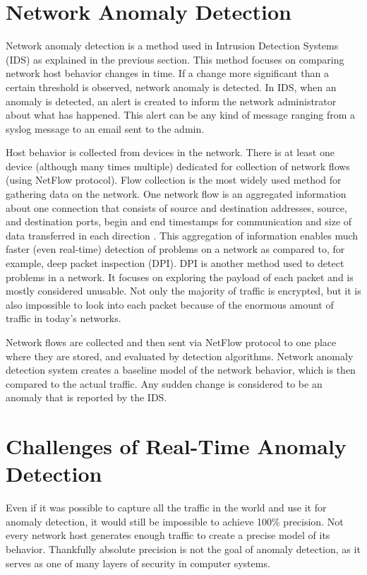 \documentclass[thesis=B,english]{FITthesis}[2012/10/20]
\begin{document}
\section{Network Anomaly Detection}\label{sec:nbad}
Network anomaly detection is a method used in Intrusion Detection Systems (IDS) as explained in the previous section.
This method focuses on comparing network host behavior changes in time.
If a change more significant than a certain threshold is observed, network anomaly is detected.
In IDS, when an anomaly is detected, an alert is created to inform the network administrator about what has happened.
This alert can be any kind of message ranging from a syslog message to an email sent to the admin.

Host behavior is collected from devices in the network.
There is at least one device (although many times multiple) dedicated for collection of network flows (using NetFlow protocol).
Flow collection is the most widely used method for gathering data on the network.
One network flow is an aggregated information about one connection that consists of source and destination addresses, source, and destination ports, begin and end timestamps for communication and size of data transferred in each direction \cite{rfc2722}.
This aggregation of information enables much faster (even real-time) detection of problems on a network as compared to, for example, deep packet inspection (DPI).
DPI is another method used to detect problems in a network.
It focuses on exploring the payload of each packet and is mostly considered unusable.
Not only the majority of traffic is encrypted, but it is also impossible to look into each packet because of the enormous amount of traffic in today's networks.

Network flows are collected and then sent via NetFlow protocol to one place where they are stored, and evaluated by detection algorithms.
Network anomaly detection system creates a baseline model of the network behavior, which is then compared to the actual traffic.
Any sudden change is considered to be an anomaly that is reported by the IDS.

\section{Challenges of Real-Time Anomaly Detection}\label{sec:challenges}
Even if it was possible to capture all the traffic in the world and use it for anomaly detection, it would still be impossible to achieve 100\% precision.
Not every network host generates enough traffic to create a precise model of its behavior.
Thankfully absolute precision is not the goal of anomaly detection, as it serves as one of many layers of security in computer systems.
\end{document}
